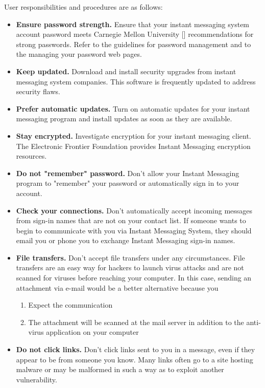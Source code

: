 User responsibilities and procedures are as follows:
\begin{itemize}
    \item \textbf{Ensure password strength.} Ensure that your instant messaging system account password meets Carnegie Mellon
    University [\cite{shay2010encountering}] recommendations for strong passwords.
    Refer to the guidelines for password management and to the managing your password web pages.
    \item \textbf{Keep updated.} Download and install security upgrades from instant messaging system companies.
    This software is frequently updated to address security flaws.
    \item \textbf{Prefer automatic updates.} Turn on automatic updates for your instant messaging program and install
    updates as soon as they are available.
    \item \textbf{Stay encrypted.} Investigate encryption for your instant messaging client.
    The Electronic Frontier Foundation provides Instant Messaging encryption resources.
    \item \textbf{Do not "remember" password.} Don't allow your Instant Messaging program to "remember" your password
    or automatically sign in to your account.
    \item \textbf{Check your connections.} Don't automatically accept incoming messages from sign-in names that are
    not on your contact list.
    If someone wants to begin to communicate with you via Instant Messaging System,
    they should email you or phone you to exchange Instant Messaging sign-in names.
    \item \textbf{File transfers.} Don't accept file transfers under any circumstances.
    File transfers are an easy way for hackers to launch virus attacks and are not scanned for viruses before reaching
    your computer.
    In this case, sending an attachment via e-mail would be a better alternative because you
    \begin{enumerate}
        \item Expect the communication
        \item The attachment will be scanned at the mail server in addition to the anti-virus application on your computer
    \end{enumerate}
    \item \textbf{Do not click links.} Don't click links sent to you in a message, even if they appear to be from
    someone you know.
    Many links often go to a site hosting malware or may be malformed in such a way as to exploit another vulnerability.

\end{itemize}
